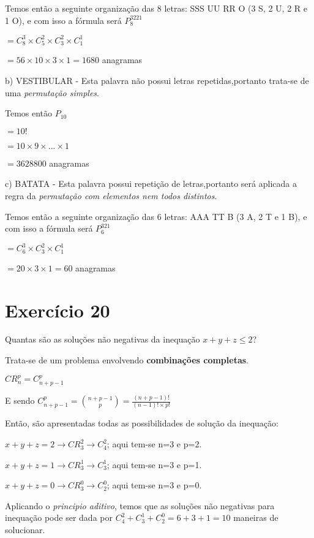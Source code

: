 \documentclass[12pt]{article}
\begin{document}
Temos então a seguinte organização das 8 letras: SSS UU RR O (3 S, 2 U, 2 R e 1 O), e com isso a fórmula será $\displaystyle P_{8}^{3221} $

$= C_8^3 \times C_5^2 \times C_3^2 \times C_1^1$

$=56 \times 10 \times 3 \times 1 = 1680$ anagramas

\bigskip

b) VESTIBULAR - Esta palavra não possui letras repetidas,portanto trata-se de uma \textit{permutação simples}.

Temos então $P_{10}$

$= 10!$

$= 10 \times 9 \times ... \times 1$

$= 3628800$ anagramas

\bigskip

c) BATATA - Esta palavra possui repetição de letras,portanto será aplicada a regra da \textit{permutação com elementos nem todos distintos}.

Temos então a seguinte organização das 6 letras: AAA TT B (3 A, 2 T e 1 B), e com isso a fórmula será $\displaystyle P_{6}^{321} $

$= C_6^3 \times C_3^2 \times C_1^1$

$= 20 \times 3 \times 1 = 60$ anagramas

\section*{Exercício 20}

Quantas são as soluções não negativas da inequação $x + y + z \leq 2$?

Trata-se de um problema envolvendo \textbf{combinações completas}. \medskip

$CR_n^p = C_{n+p-1}^p$ \medskip

E sendo $\displaystyle C_{n+p-1}^p = \binom{n+p-1}{p} = \frac{(n+p-1)!}{(n-1)! \times p!}$

Então, são apresentadas todas as possibilidades de solução da inequação:

$x + y + z = 2 \rightarrow CR_3^2 \rightarrow C_4^2$; aqui tem-se n=3 e p=2.

$x + y + z = 1 \rightarrow CR_3^1 \rightarrow C_3^1$; aqui tem-se n=3 e p=1.

$x + y + z = 0 \rightarrow CR_3^0 \rightarrow C_2^0$; aqui tem-se n=3 e p=0. \medskip

Aplicando o \textit{principio aditivo}, temos que as soluções não negativas para inequação pode ser dada por $C_4^2 + C_3^1 + C_2^0 = 6 + 3 + 1 = 10$ maneiras de solucionar.



\end{document}
